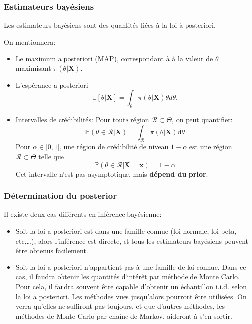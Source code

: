 \documentclass[]{article}
\providecommand{\tightlist}{%
  \setlength{\itemsep}{0pt}\setlength{\parskip}{0pt}}
\begin{document}
\hypertarget{estimateurs-bayuxe9siens}{%
\subsubsection{Estimateurs bayésiens}\label{estimateurs-bayuxe9siens}}

Les estimateurs bayésiens sont des quantités liées à la loi à
posteriori.

On mentionnera:

\begin{itemize}
\tightlist
\item
  Le maximum a posteriori (MAP), correspondant à à la valeur de
  \(\theta\) maximisant \(\pi(\theta\vert \mathbf{X})\).
\item
  L'espérance a posteriori
  \[\mathbb{E}[\theta \vert \mathbf{X}] = \int_\theta \pi(\theta \vert \mathbf{X}) \theta d \theta.\]
\item
  Intervalles de crédibilités: Pour toute région
  \(\mathcal{R} \subset \Theta\), on peut quantifier:
  \[\mathbb{P}(\theta \in \mathcal{R} \vert  \mathbf{X}) = \int_\mathcal{R} \pi(\theta \vert \mathbf{X}) \text{d}\theta\]
  Pour \(\alpha \in ]0, 1[\), une région de crédibilité de niveau
  \(1-\alpha\) est une région \(\mathcal{R} \subset \Theta\) telle que
  \[\mathbb{P}(\theta \in \mathcal{R} \vert  \mathbf{X} = \mathbf{x}) = 1 - \alpha\]
  Cet intervalle n'est pas asymptotique, mais \textbf{dépend du prior}.
\end{itemize}

\hypertarget{duxe9termination-du-posterior}{%
\subsubsection{Détermination du
posterior}\label{duxe9termination-du-posterior}}

Il existe deux cas différents en inférence bayésienne:

\begin{itemize}
\tightlist
\item
  Soit la loi a posteriori est dans une famille connue (loi normale, loi
  beta, etc,\ldots{}), alors l'inférence est directe, et tous les
  estimateurs bayésiens peuvent être obtenus facilement.
\item
  Soit la loi a posteriori n'appartient pas à une famille de loi connue.
  Dans ce cas, il faudra obtenir les quantités d'intérêt par méthode de
  Monte Carlo. Pour cela, il faudra souvent être capable d'obtenir un
  échantillon i.i.d. selon la loi a posteriori. Les méthodes vues
  jusqu'alors pourront être utilisées. On verra qu'elles ne suffiront
  pas toujours, et que d'autres méthodes, les méthodes de Monte Carlo
  par chaîne de Markov, aideront à s'en sortir.
\end{itemize}
\end{document}
